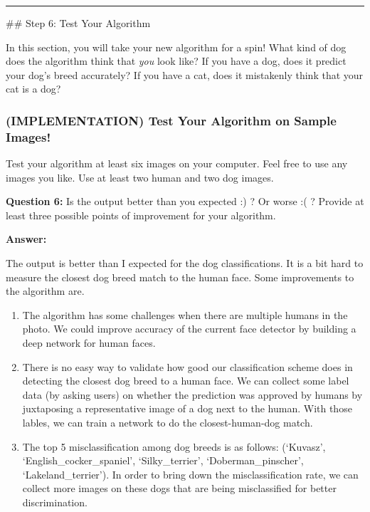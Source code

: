 \documentclass[11pt]{article}
\providecommand{\tightlist}{%
      \setlength{\itemsep}{0pt}\setlength{\parskip}{0pt}}
\begin{document}
    \begin{center}\rule{0.5\linewidth}{\linethickness}\end{center}

 \#\# Step 6: Test Your Algorithm

In this section, you will take your new algorithm for a spin! What kind
of dog does the algorithm think that \emph{you} look like? If you have a
dog, does it predict your dog's breed accurately? If you have a cat,
does it mistakenly think that your cat is a dog?

\hypertarget{implementation-test-your-algorithm-on-sample-images}{%
\subsubsection{(IMPLEMENTATION) Test Your Algorithm on Sample
Images!}\label{implementation-test-your-algorithm-on-sample-images}}

Test your algorithm at least six images on your computer. Feel free to
use any images you like. Use at least two human and two dog images.

\textbf{Question 6:} Is the output better than you expected :) ? Or
worse :( ? Provide at least three possible points of improvement for
your algorithm.

    \textbf{Answer:}

The output is better than I expected for the dog classifications. It is
a bit hard to measure the closest dog breed match to the human face.
Some improvements to the algorithm are.

\begin{enumerate}
\def\labelenumi{\arabic{enumi}.}
\tightlist
\item
  The algorithm has some challenges when there are multiple humans in
  the photo. We could improve accuracy of the current face detector by
  building a deep network for human faces.
\item
  There is no easy way to validate how good our classification scheme
  does in detecting the closest dog breed to a human face. We can
  collect some label data (by asking users) on whether the prediction
  was approved by humans by juxtaposing a representative image of a dog
  next to the human. With those lables, we can train a network to do the
  closest-human-dog match.
\item
  The top 5 misclassification among dog breeds is as follows: (`Kuvasz',
  `English\_cocker\_spaniel', `Silky\_terrier', `Doberman\_pinscher',
  `Lakeland\_terrier'). In order to bring down the misclassification
  rate, we can collect more images on these dogs that are being
  misclassified for better discrimination.
\end{enumerate}
\end{document}
